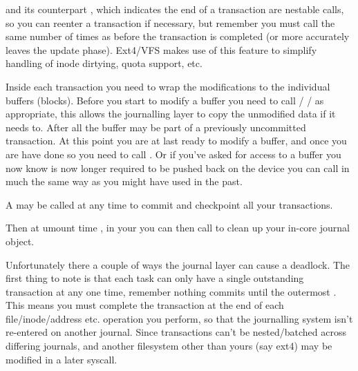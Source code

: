 \documentclass[a4paper,8pt,english]{sphinxmanual}
\begin{document}
{\hyperref[filesystems/index:c.jbd2_journal_start]{\emph{}}} and its counterpart {\hyperref[filesystems/index:c.jbd2_journal_stop]{\emph{}}},
which indicates the end of a transaction are nestable calls, so you can
reenter a transaction if necessary, but remember you must call
{\hyperref[filesystems/index:c.jbd2_journal_stop]{\emph{}}} the same number of times as
{\hyperref[filesystems/index:c.jbd2_journal_start]{\emph{}}} before the transaction is completed (or more
accurately leaves the update phase). Ext4/VFS makes use of this feature to
simplify handling of inode dirtying, quota support, etc.

Inside each transaction you need to wrap the modifications to the
individual buffers (blocks). Before you start to modify a buffer you
need to call {\hyperref[filesystems/index:c.jbd2_journal_get_create_access]{\emph{}}} /
{\hyperref[filesystems/index:c.jbd2_journal_get_write_access]{\emph{}}} /
{\hyperref[filesystems/index:c.jbd2_journal_get_undo_access]{\emph{}}} as appropriate, this allows the
journalling layer to copy the unmodified
data if it needs to. After all the buffer may be part of a previously
uncommitted transaction. At this point you are at last ready to modify a
buffer, and once you are have done so you need to call
{\hyperref[filesystems/index:c.jbd2_journal_dirty_metadata]{\emph{}}}. Or if you've asked for access to a
buffer you now know is now longer required to be pushed back on the
device you can call {\hyperref[filesystems/index:c.jbd2_journal_forget]{\emph{}}} in much the same way as you
might have used  in the past.

A {\hyperref[filesystems/index:c.jbd2_journal_flush]{\emph{}}} may be called at any time to commit and
checkpoint all your transactions.

Then at umount time , in your  you can then call
{\hyperref[filesystems/index:c.jbd2_journal_destroy]{\emph{}}} to clean up your in-core journal object.

Unfortunately there a couple of ways the journal layer can cause a
deadlock. The first thing to note is that each task can only have a
single outstanding transaction at any one time, remember nothing commits
until the outermost {\hyperref[filesystems/index:c.jbd2_journal_stop]{\emph{}}}. This means you must complete
the transaction at the end of each file/inode/address etc. operation you
perform, so that the journalling system isn't re-entered on another
journal. Since transactions can't be nested/batched across differing
journals, and another filesystem other than yours (say ext4) may be
modified in a later syscall.
\end{document}
